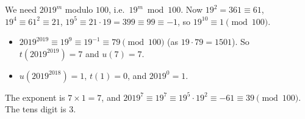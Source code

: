 We need $2019^{m}$ modulo $100$, i.e.\ $19^m\bmod100$. Now $19^2=361\equiv61$, $19^4\equiv61^2\equiv21$, $19^5\equiv21\cdot19=399\equiv99\equiv-1$, so $19^{10}\equiv1\pmod{100}$.
\begin{itemize}
\item $2019^{2019}\equiv19^{9}\equiv19^{-1}\equiv79\pmod{100}$ (as $19\cdot79=1501$). So $t\left(2019^{2019}\right)=7$ and $u(7)=7$.
\item $u\left(2019^{2018}\right)=1$, $t(1)=0$, and $2019^0=1$.
\end{itemize}
The exponent is $7\times1=7$, and $2019^7\equiv19^7\equiv19^5\cdot19^2\equiv-61\equiv39\pmod{100}$. The tens digit is $\boxed{3}$.
